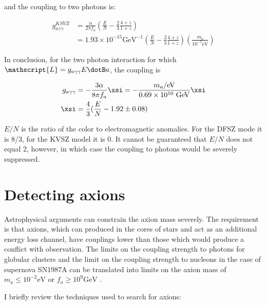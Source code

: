 \documentclass[12pt,twosides]{book}
\begin{document}
\begin{description}
and the coupling to two photons is:

\begin{align*}
g_{a\gamma\gamma}^{KSVZ} &= \frac{\alpha}{2\pi f_a}(\frac{E}{N}-\frac{2}{3}\frac{4+z}{1+z}) 
\\ &= 1.93\times10^{-15}\text{GeV}^{-1}(\frac{E}{N}-\frac{2}{3}\frac{4+z}{1+z})(\frac{m_a}{10^{-5}\text{eV}})
\end{align*}

In conclusion, for the two photon interaction for which $\mathscript{L} = g_{a\gamma\gamma}E\dotB a$, the coupling is

\begin{align*}
g_{a\gamma\gamma} &= -\frac{3\alpha}{8\pi f_a}\xsi = - \frac{m_a/\text{eV}}{0.69\times10^{10}\text{ GeV}}\xsi 
\\ \xsi &= \frac{4}{3}(\frac{E}{N} - 1.92 \pm 0.08)
\end{align*}

$E/N$ is the ratio of the color to electromagnetic anomalies. For the DFSZ mode it is 8/3, for the KVSZ model it is 0. It cannot be guaranteed that $E/N$ does not equal 2, however, in which case the coupling to photons would be severely suppressed.

\end{description}

\section{Detecting axions}

Astrophysical arguments can constrain the axion mass severely. The requirement is that axions, which can produced in the cores of stars and act as an additional energy loss channel, have couplings lower than those which would produce a conflict with observation. The limits on the coupling strength to photons for globular clusters and the limit on the coupling strength to nucleons in the case of supernova SN1987A can be translated into limits on the axion mass of $m_a \leq 10^{-2} \text{eV}$ or $f_a \geq 10^9\text{GeV}$ \cite{raffelt08}.

I briefly review the techniques used to search for axions:
\end{document}
